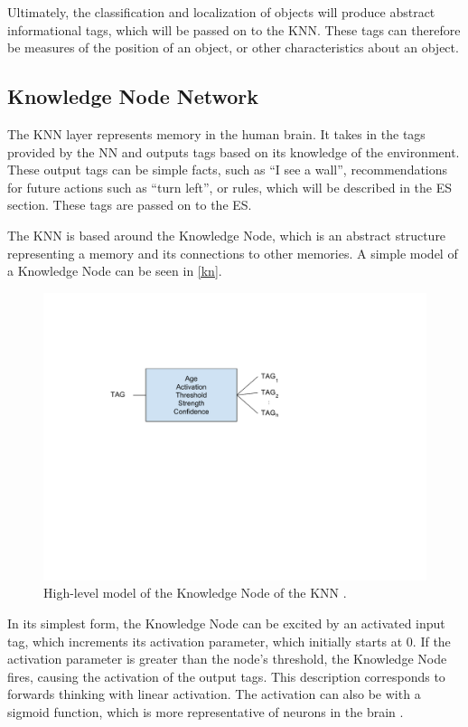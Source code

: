 \documentclass[titlepage,11pt]{article}
\newcommand{\ar}[1]{\autoref{#1}}
\begin{document}
Ultimately, the classification and localization of objects will produce abstract informational tags, which will be passed on to the KNN. These tags can therefore be measures of the position of an object, or other characteristics about an object.

\subsection{Knowledge Node Network}

The KNN layer represents memory in the human brain. It takes in the tags provided by the NN and outputs tags based on its knowledge of the environment. These output tags can be simple facts, such as ``I see a wall'', recommendations for future actions such as ``turn left'', or rules, which will be described in the ES section. These tags are passed on to the ES.

The KNN is based around the Knowledge Node, which is an abstract structure representing a memory and its connections to other memories. A simple model of a Knowledge Node can be seen in \ar{kn}.

\begin{figure}[!htb]
	\includegraphics[width=\columnwidth]{figures/kn.pdf}
	\caption[High-level model of the Knowledge Node of the KNN.]
	{High-level model of the Knowledge Node of the KNN \cite{vybihal-knowledge}.}
	\label{kn}
\end{figure}

In its simplest form, the Knowledge Node can be excited by an activated input tag, which increments its activation parameter, which initially starts at 0. If the activation parameter is greater than the node's threshold, the Knowledge Node fires, causing the activation of the output tags. This description corresponds to forwards thinking with linear activation. The activation can also be with a sigmoid function, which is more representative of neurons in the brain \cite{neuro}.
\end{document}
